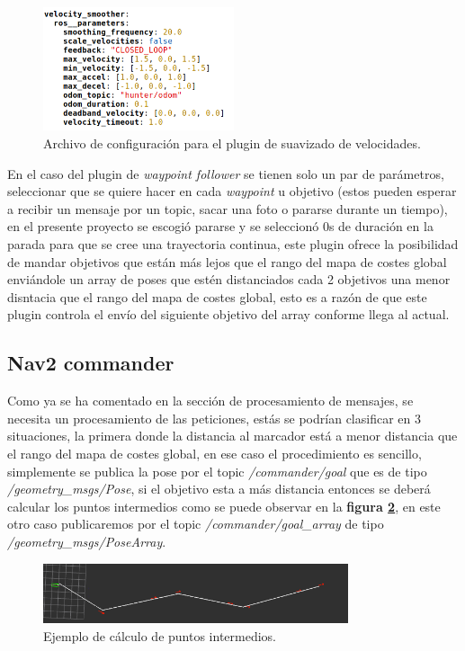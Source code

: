 \begin{figure}[H]
    \centering
    \includegraphics[width=0.5\textwidth]{images/velocity_smoother_configuracion.png}
    \caption{Archivo de configuración para el plugin de suavizado de velocidades.}
    \label{fig:suavizado_vel}
\end{figure}

En el caso del plugin de \textit{waypoint follower} se tienen solo un par de parámetros, seleccionar que se quiere hacer en cada \textit{waypoint} u 
objetivo (estos pueden esperar a recibir un mensaje por un topic, sacar una foto o pararse durante un tiempo), en el presente proyecto se escogió pararse y se seleccionó 0s de 
duración en la parada para que se cree una trayectoria continua, este plugin ofrece la posibilidad de mandar objetivos que están más lejos que el rango del 
mapa de costes global enviándole un array de poses que estén distanciados cada 2 objetivos una menor disntacia que el rango del mapa de costes global, esto es a razón de 
que este plugin controla el envío del siguiente objetivo del array conforme llega al actual.

\subsection{Nav2 commander}
Como ya se ha comentado en la sección de procesamiento de mensajes, se necesita un procesamiento de las peticiones, estás se podrían clasificar en 3 situaciones, la primera 
donde la distancia al marcador está a menor distancia que el rango del mapa de costes global, en ese caso el procedimiento es sencillo, simplemente se publica la pose por el topic 
\textit{/commander/goal} que es de tipo \textit{/geometry\_msgs/Pose}, si el objetivo esta a más distancia entonces se deberá calcular los puntos intermedios como se puede observar en la 
\textbf{figura \ref{fig:puntos_intermedios}}, en este otro caso publicaremos por el topic \textit{/commander/goal\_array} de tipo \textit{/geometry\_msgs/PoseArray}.


\begin{figure}[H]
    \centering
    \includegraphics[width=0.8\textwidth]{images/camino_punto_inter.png}
    \caption{Ejemplo de cálculo de puntos intermedios.}
    \label{fig:puntos_intermedios}
\end{figure}

